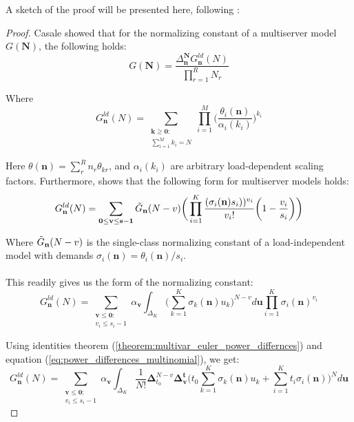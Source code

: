 A sketch of the proof will be presented here, following \cite{Casale2018ExplicitRepresentations}:
\begin{proof}
    
    Casale \cite{Casale2018ExplicitRepresentations} showed that for the normalizing constant of a multiserver model \(G(\mathbf{N})\), the following holds:
    \begin{equation} \label{eq:multiserver_1}
        G(\mathbf{N}) = \frac{\Delta_{\mathbf{n}}^{\mathbf{N}} G_{\mathbf{n}}^{ld}(N)}{\prod_{r=1}^R N_r}
    \end{equation}
    
    Where 
    \begin{equation}
        G^{ld}_{\mathbf{n}}(N) = \sum_{\substack{\mathbf{k} \geq \mathbf{0}: \\ \sum_{i=1}^Mk_i = N} } \prod_{i=1}^M \bigg( \frac{\theta_i(\mathbf{n})}{\alpha_i(k_i)} \bigg)^{k_i}    
    \end{equation}
    
    Here \(\theta(\mathbf{n}) = \sum_r^R n_r \theta_{kr}\), and \(\alpha_i(k_i)\) are arbitrary load-dependent scaling factors. Furthermore, \cite{Gordon1990TheNetworks} shows that the following form for multiserver models holds:
    \begin{equation}
        G^{ld}_{\mathbf{n}}(N) = \sum_{\mathbf{0 \leq v \leq s-1}} \Tilde{G}_{\mathbf{n}}(N-v) \bigg( \prod_{i=1}^K \frac{(\sigma_i(\mathbf{n}) s_i))^{v_i}}{v_i!} \bigg( 1 - \frac{v_i}{s_i} \bigg) \bigg)
    \end{equation}
    
    Where \(\Tilde{G}_{\mathbf{n}}(N-v)\) is the single-class normalizing constant of a load-independent model with demands \(\sigma_i(\mathbf{n}) = \theta_i(\mathbf{n})/s_i\).
    \\\\
    This readily gives us the form of the normalizing constant:
    \begin{equation}
        G^{ld}_{\mathbf{n}}(N) = \sum_{\substack{\mathbf{v \leq 0:} \\ v_i \leq s_i-1 }} \alpha_\mathbf{v} \int_{\Delta_K} \bigg( \sum_{k=1}^K \sigma_k(\mathbf{n})u_k \bigg)^{N-v} d\mathbf{u} \prod_{i=1}^K \sigma_i(\mathbf{n})^{v_i}
    \end{equation}
    
    Using identities theorem (\ref{theorem:multivar_euler_power_differnces}) and equation (\ref{eq:power_differences_multinomial}), we get:
    \begin{equation}
        G^{ld}_{\mathbf{n}}(N) = \sum_{\substack{\mathbf{v \leq 0:} \\ v_i \leq s_i-1 }} \alpha_\mathbf{v} \int_{\Delta_K} \frac{1}{N!} \boldsymbol{\Delta}_{t_0}^{N-v} \boldsymbol{\Delta}_{\mathbf{v}}^{\mathbf{t}} \bigg( t_0 \sum_{k=1}^K \sigma_k(\mathbf{n})u_k + \sum_{i=1}^K t_i \sigma_i(\mathbf{n})\bigg)^N d\mathbf{u}
    \end{equation}
    

\end{proof}
